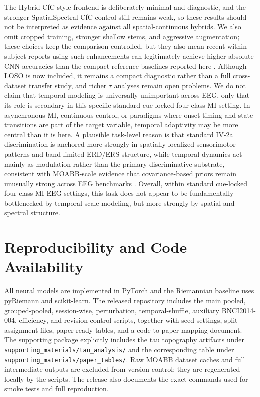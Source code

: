 \documentclass[journal]{IEEEtran}
\begin{document}
The Hybrid-CfC-style frontend is deliberately minimal and diagnostic, and the stronger SpatialSpectral-CfC control still remains weak, so these results should not be interpreted as evidence against all spatial-continuous hybrids. We also omit cropped training, stronger shallow stems, and aggressive augmentation; these choices keep the comparison controlled, but they also mean recent within-subject reports using such enhancements can legitimately achieve higher absolute CNN accuracies than the compact reference baselines reported here \cite{ingolfsson2020eegtcnet,elouahidi2024simpleconv,li2024ctnet,han2024eegcct}. Although LOSO is now included, it remains a compact diagnostic rather than a full cross-dataset transfer study, and richer $\tau$ analyses remain open problems. We do not claim that temporal modeling is universally unimportant across EEG, only that its role is secondary in this specific standard cue-locked four-class MI setting. In asynchronous MI, continuous control, or paradigms where onset timing and state transitions are part of the target variable, temporal adaptivity may be more central than it is here. A plausible task-level reason is that standard IV-2a discrimination is anchored more strongly in spatially localized sensorimotor patterns and band-limited ERD/ERS structure, while temporal dynamics act mainly as modulation rather than the primary discriminative substrate, consistent with MOABB-scale evidence that covariance-based priors remain unusually strong across EEG benchmarks \cite{chevallier2024moabb}. Overall, within standard cue-locked four-class MI-EEG settings, this task does not appear to be fundamentally bottlenecked by temporal-scale modeling, but more strongly by spatial and spectral structure.

\section*{Reproducibility and Code Availability}

All neural models are implemented in PyTorch and the Riemannian baseline uses pyRiemann and scikit-learn. The released repository includes the main pooled, grouped-pooled, session-wise, perturbation, temporal-shuffle, auxiliary BNCI2014-004, efficiency, and revision-control scripts, together with seed settings, split-assignment files, paper-ready tables, and a code-to-paper mapping document. The supporting package explicitly includes the tau topography artifacts under \texttt{supporting\_materials/tau\_analysis/} and the corresponding table under \texttt{supporting\_materials/paper\_tables/}. Raw MOABB dataset caches and full intermediate outputs are excluded from version control; they are regenerated locally by the scripts. The release also documents the exact commands used for smoke tests and full reproduction.
\end{document}
